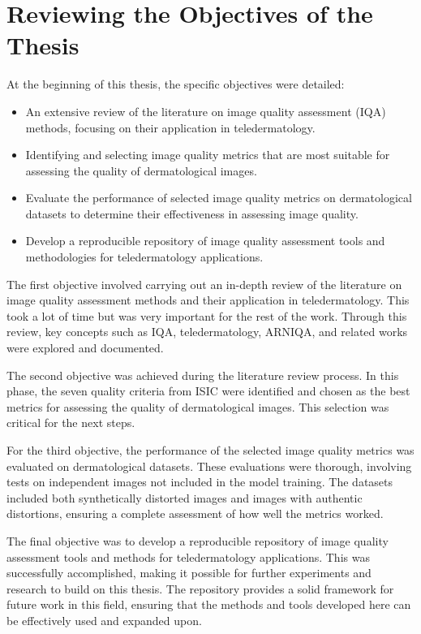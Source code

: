 \section{Reviewing the Objectives of the Thesis}
\label{sec:ReviewingObjectives}
At the beginning of this thesis, the specific objectives were detailed:

\begin{itemize}
    \item An extensive review of the literature on image quality assessment (IQA) methods, focusing on their application in teledermatology.
    \item Identifying and selecting image quality metrics that are most suitable for assessing the quality of dermatological images.
    \item Evaluate the performance of selected image quality metrics on dermatological datasets to determine their effectiveness in assessing image quality.
    \item Develop a reproducible repository of image quality assessment tools and methodologies for teledermatology applications.
\end{itemize}
\noindent
The first objective involved carrying out an in-depth review of the literature on image quality assessment methods and their application in teledermatology. This took a lot of time but was very important for the rest of the work. Through this review, key concepts such as IQA, teledermatology, ARNIQA, and related works were explored and documented. \par
\vspace{\baselineskip}
\noindent
The second objective was achieved during the literature review process. In this phase, the seven quality criteria from ISIC were identified and chosen as the best metrics for assessing the quality of dermatological images. This selection was critical for the next steps. \par
\vspace{\baselineskip}
\noindent
For the third objective, the performance of the selected image quality metrics was evaluated on dermatological datasets. These evaluations were thorough, involving tests on independent images not included in the model training. The datasets included both synthetically distorted images and images with authentic distortions, ensuring a complete assessment of how well the metrics worked. \par
\vspace{\baselineskip}
\noindent
The final objective was to develop a reproducible repository of image quality assessment tools and methods for teledermatology applications. This was successfully accomplished, making it possible for further experiments and research to build on this thesis. The repository provides a solid framework for future work in this field, ensuring that the methods and tools developed here can be effectively used and expanded upon. \par
